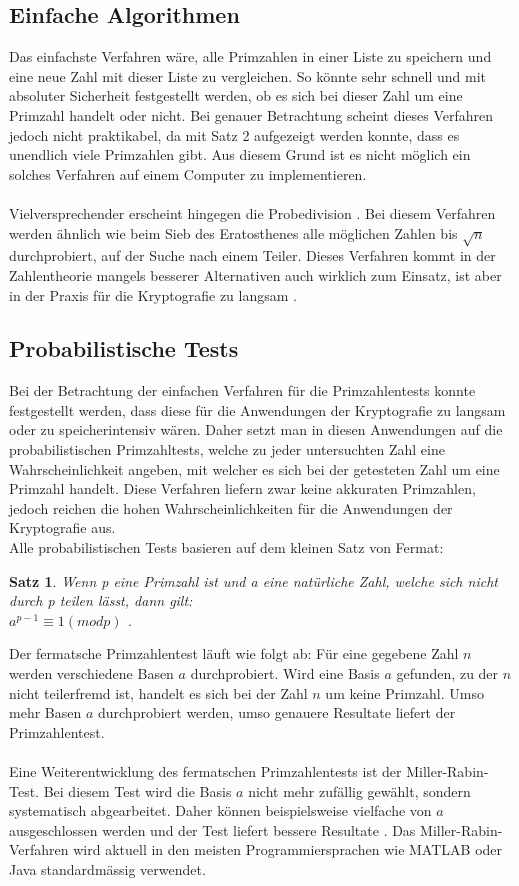 \documentclass[12pt,a4paper]{article}
\newtheorem{theorem}{Satz}
\begin{document}
\subsection{Einfache Algorithmen}
Das einfachste Verfahren wäre, alle Primzahlen in einer Liste zu speichern und eine neue Zahl mit dieser Liste zu vergleichen. So könnte sehr schnell und mit absoluter Sicherheit festgestellt werden, ob es sich bei dieser Zahl um eine Primzahl handelt oder nicht. Bei genauer Betrachtung scheint dieses Verfahren jedoch nicht praktikabel, da mit Satz 2 aufgezeigt werden konnte, dass es unendlich viele Primzahlen gibt. Aus diesem Grund ist es nicht möglich ein solches Verfahren auf einem Computer zu implementieren.\\
\\
Vielversprechender erscheint hingegen die Probedivision \cite{Forster.2015}. Bei diesem Verfahren werden ähnlich wie beim Sieb des Eratosthenes alle möglichen Zahlen bis $\sqrt{n}$ durchprobiert, auf der Suche nach einem Teiler. Dieses Verfahren kommt in der Zahlentheorie mangels besserer Alternativen auch wirklich zum Einsatz, ist aber in der Praxis für die Kryptografie zu langsam \cite{Forster.2015}.

\subsection{Probabilistische Tests}
Bei der Betrachtung der einfachen Verfahren für die Primzahlentests konnte festgestellt werden, dass diese für die Anwendungen der Kryptografie zu langsam oder zu speicherintensiv wären. Daher setzt man in diesen Anwendungen auf die probabilistischen Primzahltests, welche zu jeder untersuchten Zahl eine Wahrscheinlichkeit angeben, mit welcher es sich bei der getesteten Zahl um eine Primzahl handelt. Diese Verfahren liefern zwar keine akkuraten Primzahlen, jedoch reichen die hohen Wahrscheinlichkeiten für die Anwendungen der Kryptografie aus. \\
Alle probabilistischen Tests basieren auf dem kleinen Satz von Fermat:
\begin{theorem}
Wenn p eine Primzahl ist und a eine natürliche Zahl, welche sich nicht durch p teilen lässt, dann gilt:\\
$a^{p-1}\equiv 1 (mod p)$ \cite{Rosen.2018}.
\end{theorem}
Der fermatsche Primzahlentest läuft wie folgt ab: Für eine gegebene Zahl $n$ werden verschiedene Basen $a$ durchprobiert. Wird eine Basis $a$ gefunden, zu der $n$ nicht teilerfremd ist, handelt es sich bei der Zahl $n$ um keine Primzahl. Umso mehr Basen $a$ durchprobiert werden, umso genauere Resultate liefert der Primzahlentest.\\
\\
Eine Weiterentwicklung des fermatschen Primzahlentests ist der Miller-Rabin-Test. Bei diesem Test wird die Basis $a$ nicht mehr zufällig gewählt, sondern systematisch abgearbeitet. Daher können beispielsweise vielfache von $a$ ausgeschlossen werden und der Test liefert bessere Resultate \cite{Forster.2015}. Das Miller-Rabin-Verfahren wird aktuell in den meisten Programmiersprachen wie MATLAB oder Java standardmässig verwendet.
\end{document}
